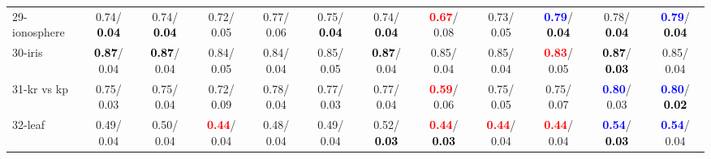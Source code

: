 \begin{table}[h]
\begin{center}
{\begin{tabular}{lc|c|c|c|c|c|c|c|c|c|c}
29-ionosphere &   0.74/\textcolor{black}{\textbf{  0.04}} &   0.74/\textcolor{black}{\textbf{  0.04}} &   0.72/  0.05 &   0.77/  0.06 &   0.75/\textcolor{black}{\textbf{  0.04}} &   0.74/\textcolor{black}{\textbf{  0.04}} & \textcolor{red}{\textbf{  0.67}}/  0.08 &   0.73/  0.05 & \textcolor{blue}{\textbf{  0.79}}/\textcolor{black}{\textbf{  0.04}} &   0.78/\textcolor{black}{\textbf{  0.04}} & \textcolor{blue}{\textbf{  0.79}}/\textcolor{black}{\textbf{  0.04}} \\
30-iris & \textcolor{black}{\textbf{  0.87}}/  0.04 & \textcolor{black}{\textbf{  0.87}}/  0.04 &   0.84/  0.05 &   0.84/  0.04 &   0.85/  0.05 & \textcolor{black}{\textbf{  0.87}}/  0.04 &   0.85/  0.04 &   0.85/  0.04 & \textcolor{red}{\textbf{  0.83}}/  0.05 & \textcolor{black}{\textbf{  0.87}}/\textcolor{black}{\textbf{  0.03}} &   0.85/  0.04 \\
31-kr vs kp &   0.75/  0.03 &   0.75/  0.04 &   0.72/  0.09 &   0.78/  0.04 &   0.77/  0.03 &   0.77/  0.04 & \textcolor{red}{\textbf{  0.59}}/  0.06 &   0.75/  0.05 &   0.75/  0.07 & \textcolor{blue}{\textbf{  0.80}}/  0.03 & \textcolor{blue}{\textbf{  0.80}}/\textcolor{black}{\textbf{  0.02}} \\
32-leaf &   0.49/  0.04 &   0.50/  0.04 & \textcolor{red}{\textbf{  0.44}}/  0.04 &   0.48/  0.04 &   0.49/  0.04 &   0.52/\textcolor{black}{\textbf{  0.03}} & \textcolor{red}{\textbf{  0.44}}/\textcolor{black}{\textbf{  0.03}} & \textcolor{red}{\textbf{  0.44}}/  0.04 & \textcolor{red}{\textbf{  0.44}}/  0.04 & \textcolor{blue}{\textbf{  0.54}}/\textcolor{black}{\textbf{  0.03}} & \textcolor{blue}{\textbf{  0.54}}/  0.04 \\\end{tabular}}\label{stratsALCKappa0bestReduxa}
\end{center}
\end{table}
